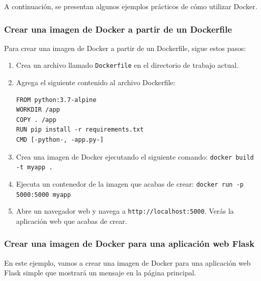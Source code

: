\documentclass{article}
\begin{document}
A continuación, se presentan algunos ejemplos prácticos de cómo utilizar Docker.

\subsubsection{Crear una imagen de Docker a partir de un Dockerfile}

Para crear una imagen de Docker a partir de un Dockerfile, sigue estos pasos:

\begin{enumerate}
\item Crea un archivo llamado \lstinline{Dockerfile} en el directorio de trabajo actual.
\item Agrega el siguiente contenido al archivo Dockerfile:

\begin{lstlisting}[numbers=none]
FROM python:3.7-alpine
WORKDIR /app
COPY . /app
RUN pip install -r requirements.txt
CMD [-python-, -app.py-]
\end{lstlisting}
\item Crea una imagen de Docker ejecutando el siguiente comando: \lstinline{docker build -t myapp .}
\item Ejecuta un contenedor de la imagen que acabas de crear: \lstinline{docker run -p 5000:5000 myapp}
\item Abre un navegador web y navega a \lstinline{http://localhost:5000}. Verás la aplicación web que acabas de crear.
\end{enumerate}

\subsubsection{Crear una imagen de Docker para una aplicación web Flask}

En este ejemplo, vamos a crear una imagen de Docker para una aplicación web Flask simple que mostrará un mensaje en la página principal.
\end{document}
